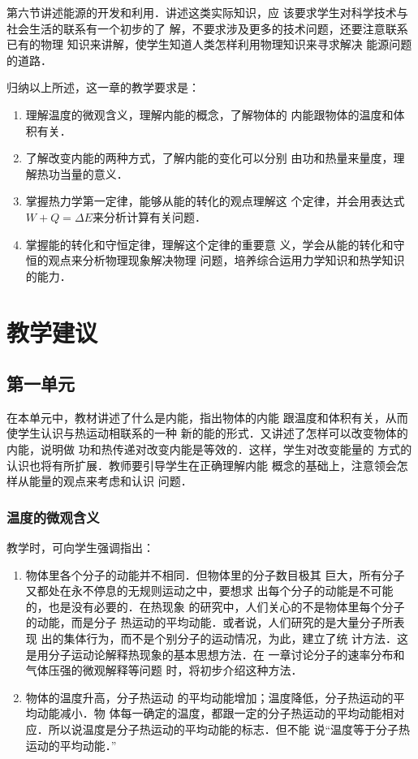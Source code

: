 第六节讲述能源的开发和利用．讲述这类实际知识，应
该要求学生对科学技术与社会生活的联系有一个初步的了
解，不要求涉及更多的技术问题，还要注意联系已有的物理
知识来讲解，使学生知道人类怎样利用物理知识来寻求解决
能源问题的道路．

归纳以上所述，这一章的教学要求是：
\begin{enumerate}
\item 理解温度的微观含义，理解内能的概念，了解物体的
内能跟物体的温度和体积有关．
\item 了解改变内能的两种方式，了解内能的变化可以分别
由功和热量来量度，理解热功当量的意义．
\item 掌握热力学第一定律，能够从能的转化的观点理解这
个定律，并会用表达式$W+Q=\Delta E$来分析计算有关问题．
\item 掌握能的转化和守恒定律，理解这个定律的重要意
义，学会从能的转化和守恒的观点来分析物理现象解决物理
问题，培养综合运用力学知识和热学知识的能力．
\end{enumerate}

\section{教学建议}
\subsection{第一单元}
在本单元中，教材讲述了什么是内能，指出物体的内能
跟温度和体积有关，从而使学生认识与热运动相联系的一种
新的能的形式．又讲述了怎样可以改变物体的内能，说明做
功和热传递对改变内能是等效的．这样，学生对改变能量的
方式的认识也将有所扩展．教师要引导学生在正确理解内能
概念的基础上，注意领会怎样从能量的观点来考虑和认识
问题．

\subsubsection{温度的微观含义} 教学时，可向学生强调指出：
\begin{enumerate}
\item 
物体里各个分子的动能并不相同．但物体里的分子数目极其
巨大，所有分子又都处在永不停息的无规则运动之中，要想求
出每个分子的动能是不可能的，也是没有必要的．在热现象
的研究中，人们关心的不是物体里每个分子的动能，而是分子
热运动的平均动能．或者说，人们研究的是大量分子所表现
出的集体行为，而不是个别分子的运动情况，为此，建立了统
计方法．这是用分子运动论解释热现象的基本思想方法．在
一章讨论分子的速率分布和气体压强的微观解释等问题
时，将初步介绍这种方法．    \item 物体的温度升高，分子热运动
的平均动能增加；温度降低，分子热运动的平均动能减小．物
体每一确定的温度，都跟一定的分子热运动的平均动能相对
应．所以说温度是分子热运动的平均动能的标志．但不能
说“温度等于分子热运动的平均动能．”
\end{enumerate}


